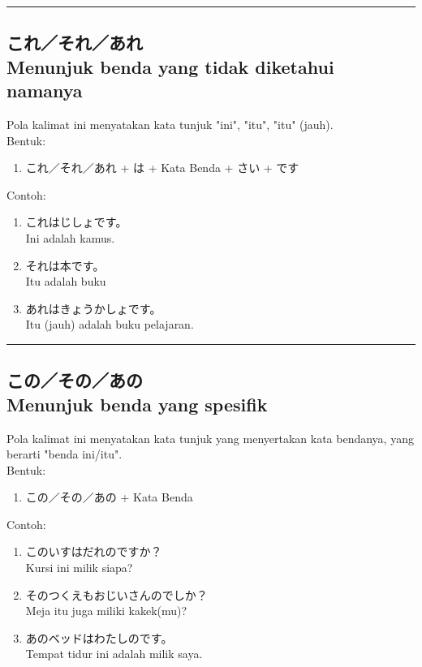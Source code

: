 \vspace{0.2cm}\hrule height 1pt\vspace{0.2cm}

\newpage
\subsection*{
    これ／それ／あれ \\
    Menunjuk benda yang tidak diketahui namanya
}
Pola kalimat ini menyatakan kata tunjuk "ini", "itu", "itu" (jauh).\\
Bentuk:
\begin{enumerate}
    \item これ／それ／あれ + は + Kata Benda + さい + です
\end{enumerate}
Contoh: 
\begin{enumerate}
    \item これはじしょです。
    \\ Ini adalah kamus.
    \item それは本です。
    \\ Itu adalah buku
    \item あれはきょうかしょです。
    \\ Itu (jauh) adalah buku pelajaran.
\end{enumerate}

\vspace{0.2cm}\hrule height 1pt\vspace{0.2cm}


\subsection*{
    この／その／あの \\
    Menunjuk benda yang spesifik
}
Pola kalimat ini menyatakan kata tunjuk yang menyertakan kata 
bendanya, yang berarti "benda ini/itu".\\
Bentuk:
\begin{enumerate}
    \item この／その／あの + Kata Benda
\end{enumerate}
Contoh: 
\begin{enumerate}
    \item このいすはだれのですか？
    \\ Kursi ini milik siapa?
    \item そのつくえもおじいさんのでしか？
    \\ Meja itu juga miliki kakek(mu)?
    \item あのベッドはわたしのです。
    \\ Tempat tidur ini adalah milik saya.
\end{enumerate}


